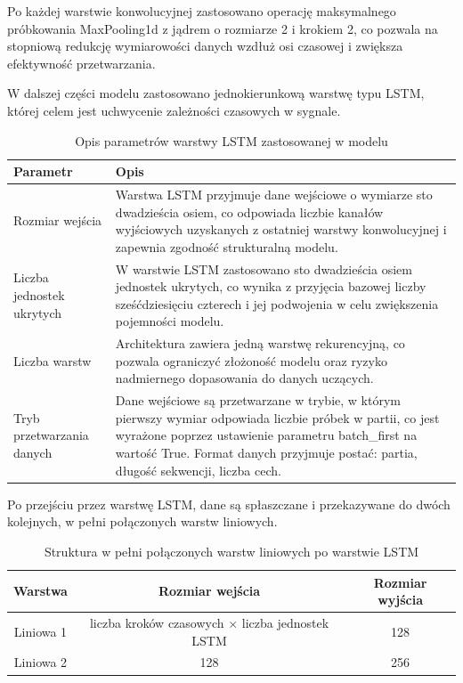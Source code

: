 \documentclass{article}
\begin{document}
Po każdej warstwie konwolucyjnej zastosowano operację maksymalnego próbkowania MaxPooling1d z jądrem o rozmiarze 2 i krokiem 2, co pozwala na stopniową redukcję wymiarowości danych wzdłuż osi czasowej i zwiększa efektywność przetwarzania.

W dalszej części modelu zastosowano jednokierunkową warstwę typu LSTM, której celem jest uchwycenie zależności czasowych w sygnale.

\begin{table}[h!]
\renewcommand{\arraystretch}{1.3}
\centering
\begin{tabular}{|l|p{10cm}|}
\hline
\textbf{Parametr} & \textbf{Opis} \\
\hline
Rozmiar wejścia & Warstwa LSTM przyjmuje dane wejściowe o wymiarze sto dwadzieścia osiem, co odpowiada liczbie kanałów wyjściowych uzyskanych z ostatniej warstwy konwolucyjnej i zapewnia zgodność strukturalną modelu. \\
\hline
Liczba jednostek ukrytych & W warstwie LSTM zastosowano sto dwadzieścia osiem jednostek ukrytych, co wynika z przyjęcia bazowej liczby sześćdziesięciu czterech i jej podwojenia w celu zwiększenia pojemności modelu. \\
\hline
Liczba warstw & Architektura zawiera jedną warstwę rekurencyjną, co pozwala ograniczyć złożoność modelu oraz ryzyko nadmiernego dopasowania do danych uczących. \\
\hline
Tryb przetwarzania danych & Dane wejściowe są przetwarzane w trybie, w którym pierwszy wymiar odpowiada liczbie próbek w partii, co jest wyrażone poprzez ustawienie parametru batch\_first na wartość True. Format danych przyjmuje postać: partia, długość sekwencji, liczba cech. \\
\hline
\end{tabular}
\caption{Opis parametrów warstwy LSTM zastosowanej w modelu}
\end{table}


Po przejściu przez warstwę LSTM, dane są spłaszczane i przekazywane do dwóch kolejnych, w pełni połączonych warstw liniowych.

\begin{table}[h]
    \centering
    \label{tab:fc_layers}
   \begin{tabular}{|c|c|c|}
        \hline
        \textbf{Warstwa} & \textbf{Rozmiar wejścia} & \textbf{Rozmiar wyjścia} \\
        \hline
        Liniowa 1 & liczba kroków czasowych $\times$ liczba jednostek LSTM & 128 \\
        \hline
        Liniowa 2 & 128 & 256  \\
        \hline
    \end{tabular}
        \caption{Struktura w pełni połączonych warstw liniowych po warstwie LSTM}
\end{table}
\end{document}
